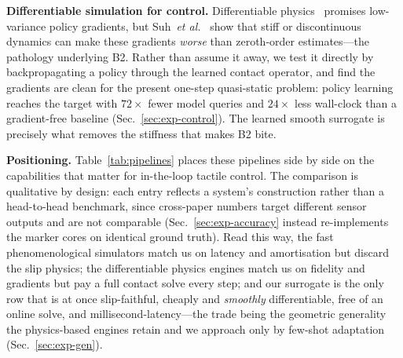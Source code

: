 \documentclass[conference]{IEEEtran}
\begin{document}
\textbf{Differentiable simulation for control.}
Differentiable physics~\cite{hu2020difftaichi} promises low-variance policy
gradients, but Suh~\textit{et al.}~\cite{suh2022diffsim} show that stiff or
discontinuous dynamics can make these gradients \emph{worse} than zeroth-order
estimates---the pathology underlying B2. Rather than assume it away, we test it
directly by backpropagating a policy through the learned contact operator, and
find the gradients are clean for the present one-step quasi-static problem: policy
learning reaches the target with $72\times$ fewer model queries and $24\times$
less wall-clock than a gradient-free baseline (Sec.~\ref{sec:exp-control}). The
learned smooth surrogate is precisely what removes the stiffness that makes B2
bite.

\smallskip\noindent\textbf{Positioning.} Table~\ref{tab:pipelines} places these
pipelines side by side on the capabilities that matter for in-the-loop tactile
control. The comparison is qualitative by design: each entry reflects a system's
construction rather than a head-to-head benchmark, since cross-paper numbers
target different sensor outputs and are not comparable (Sec.~\ref{sec:exp-accuracy}
instead re-implements the marker cores on identical ground truth). Read this way,
the fast phenomenological simulators match us on latency and amortisation but
discard the slip physics; the differentiable physics engines match us on fidelity
and gradients but pay a full contact solve every step; and our surrogate is the
only row that is at once slip-faithful, cheaply and \emph{smoothly}
differentiable, free of an online solve, and millisecond-latency---the trade being
the geometric generality the physics-based engines retain and we approach only by
few-shot adaptation (Sec.~\ref{sec:exp-gen}).
\end{document}

